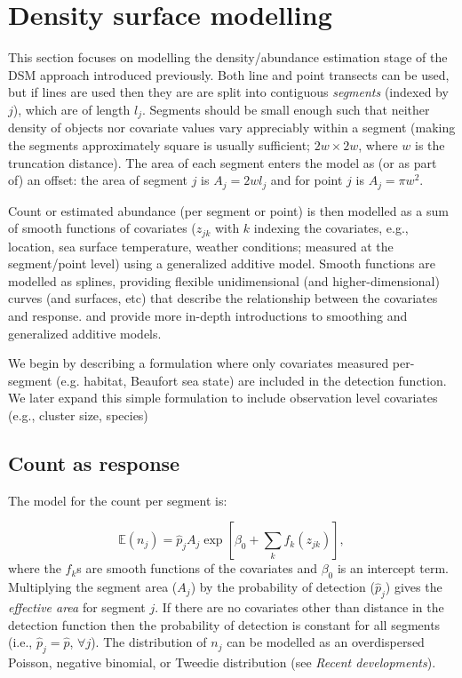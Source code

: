 \documentclass[a4paper,12pt]{article}
\begin{document}
\section*{Density surface modelling}
\label{s:dsm}

This section focuses on modelling the density/abundance estimation stage of the DSM approach introduced previously. Both line and point transects can be used, but if lines are used then they are are split into contiguous \textit{segments} (indexed by $j$), which are of length $l_j$. Segments should be small enough such that neither density of objects nor covariate values vary appreciably within a segment (making the segments approximately square is usually sufficient; $2w\times 2w$, where $w$ is the truncation distance). The area of each segment enters the model as (or as part of) an offset: the area of segment $j$ is $A_j = 2wl_j$ and for point $j$ is $A_j=\pi w^2$. 

Count or estimated abundance (per  segment or point) is then modelled as a sum of smooth functions of covariates ($z_{jk}$ with $k$ indexing the covariates, e.g., location, sea surface temperature, weather conditions; measured at the segment/point level) using a generalized additive model. Smooth functions are modelled as splines, providing flexible unidimensional (and higher-dimensional) curves (and surfaces, etc) that describe the relationship between the covariates and response. \cite{Wood:2006wz} and \cite{ruppert2003semiparametric} provide more in-depth introductions to smoothing and generalized additive models.

We begin by describing a formulation where only covariates measured per-segment (e.g. habitat, Beaufort sea state) are included in the detection function. We later expand this simple formulation to include observation level covariates (e.g., cluster size, species)

\subsection*{Count as response}

The model for the count per segment is:

\begin{equation*}
\mathbb{E}(n_j) = \hat{p}_j A_j \exp\left[ \beta_0 + \sum_k f_k\left(z_{jk}\right) \right],
\end{equation*}
where the $f_k$s are smooth functions of the covariates and $\beta_0$ is an intercept term. Multiplying the segment area ($A_j$) by the probability of detection ($\hat{p}_j$) gives the \textit{effective area} for segment $j$. If there are no covariates other than distance in the detection function then the probability of detection is constant for all segments (i.e., $\hat{p}_j=\hat{p}$, $\forall j$). The distribution of $n_j$ can be modelled as an overdispersed Poisson, negative binomial, or Tweedie distribution (see \textit{Recent developments}).
\end{document}
